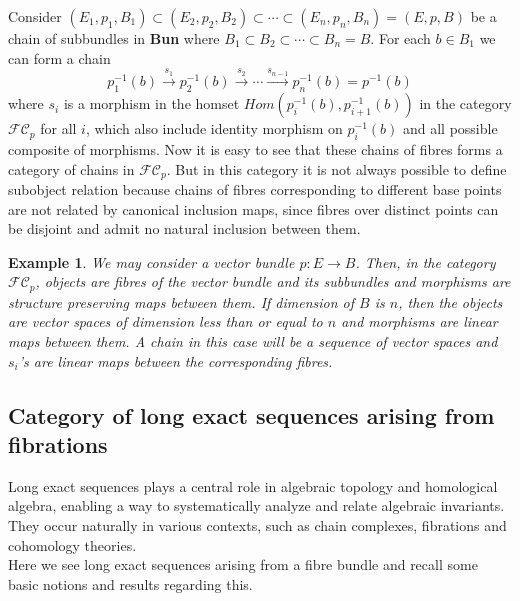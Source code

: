 \documentclass{amsart}
\theoremstyle{plain}
\newtheorem{exam}{Example}
\begin{document}
Consider $(E_1, p_1, B_1) \subset (E_2, p_2, B_2) \subset \cdots \subset (E_n, p_n, B_n) = (E, p, B) $ be a chain of subbundles in \textbf{Bun} where $B_1 \subset B_2 \subset \cdots \subset B_n =B$. For each $b \in B_1$ we can form a chain $$ p_1^{-1}(b) \stackrel{s_1} \rightarrow p_2^{-1}(b) \stackrel{s_2} \rightarrow \cdots \stackrel{s_{n-1}} \rightarrow  p_n^{-1}(b)= p^{-1}{(b)}$$ where $s_i$ is a morphism in the homset $Hom(p_i^{-1}(b), p_{i+1}^{-1}(b))$ in the category $\mathcal{FC}_p $ for all $i$, which also include identity morphism on $p_i^{-1}(b)$ and all possible composite of morphisms. Now it is easy to see that these  chains of fibres forms  a category of chains  in $\mathcal{FC}_p $. But in this category it is not always possible to define subobject relation because chains of fibres corresponding to different base points are not related by canonical inclusion maps, since fibres over distinct points can be disjoint and admit no natural inclusion between them.
\begin{exam}
	We may consider a vector bundle $p: E \rightarrow B$. Then, in the category $\mathcal{FC}_p $, objects are fibres of the vector bundle and its subbundles and morphisms are structure preserving maps between them. If dimension of $B$ is $n$, then the objects are vector spaces of dimension less than or equal to $n$ and morphisms are linear maps between them.   
	A chain in this case will be a sequence of vector spaces and $s_i$'s are linear maps between the corresponding fibres. \\
\end{exam}
\subsection{Category of long exact sequences arising from fibrations}
Long exact sequences plays a central role in algebraic topology and homological algebra, enabling a way to systematically analyze and relate algebraic invariants. They occur naturally in various contexts, such as chain complexes, fibrations and cohomology theories. \\
Here we see long exact sequences arising from a fibre bundle and recall some basic notions and results regarding this.
\end{document}
